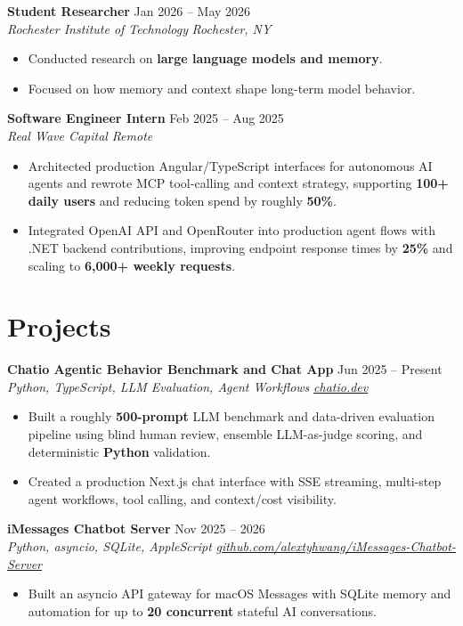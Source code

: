 \documentclass[10pt,letterpaper]{article}
\newif\ifresumeFirstRole
\newcommand{\resumeRole}[4]{%
  \ifresumeFirstRole
    \global\resumeFirstRolefalse
  \else
    \vspace{0pt plus 1fill}%
  \fi
  \textbf{#1} \hfill #2\\
  \textit{#3} \hfill \textit{#4}
}
\begin{document}
\resumeRole{Student Researcher}{Jan 2026 -- May 2026}{Rochester Institute of Technology}{Rochester, NY}
\begin{itemize}
  \item Conducted research on \textbf{large language models and memory}.
  \item Focused on how memory and context shape long-term model behavior.
\end{itemize}

\resumeRole{Software Engineer Intern}{Feb 2025 -- Aug 2025}{Real Wave Capital}{Remote}
\begin{itemize}
  \item Architected production Angular/TypeScript interfaces for autonomous AI agents and rewrote MCP tool-calling and context strategy, supporting \textbf{100+ daily users} and reducing token spend by roughly \textbf{50\%}.
  \item Integrated OpenAI API and OpenRouter into production agent flows with .NET backend contributions, improving endpoint response times by \textbf{25\%} and scaling to \textbf{6,000+ weekly requests}.
\end{itemize}

\section*{Projects}
\resumeRole{Chatio Agentic Behavior Benchmark and Chat App}{Jun 2025 -- Present}{Python, TypeScript, LLM Evaluation, Agent Workflows}{\href{https://chatio.dev}{chatio.dev}}
\begin{itemize}
  \item Built a roughly \textbf{500-prompt} LLM benchmark and data-driven evaluation pipeline using blind human review, ensemble LLM-as-judge scoring, and deterministic \textbf{Python} validation.
  \item Created a production Next.js chat interface with SSE streaming, multi-step agent workflows, tool calling, and context/cost visibility.
\end{itemize}

\resumeRole{iMessages Chatbot Server}{Nov 2025 -- 2026}{Python, asyncio, SQLite, AppleScript}{\href{https://github.com/alextyhwang/iMessages-Chatbot-Server}{github.com/alextyhwang/iMessages-Chatbot-Server}}
\begin{itemize}
  \item Built an asyncio API gateway for macOS Messages with SQLite memory and automation for up to \textbf{20 concurrent} stateful AI conversations.
\end{itemize}
\end{document}
